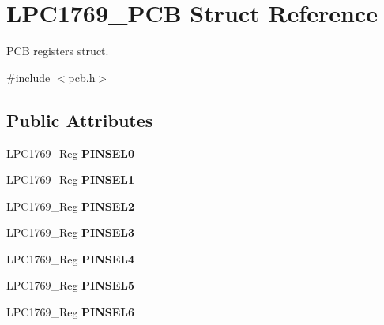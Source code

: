 \hypertarget{struct_l_p_c1769___p_c_b}{\section{L\+P\+C1769\+\_\+\+P\+C\+B Struct Reference}
\label{struct_l_p_c1769___p_c_b}
}


P\+C\+B registers struct.  




{\ttfamily \#include $<$pcb.\+h$>$}

\subsection*{Public Attributes}
\begin{DoxyCompactItemize}
\item 
\hypertarget{struct_l_p_c1769___p_c_b_a68940dff298029649dd0c2db4b47ff5c}{L\+P\+C1769\+\_\+\+Reg {\bfseries P\+I\+N\+S\+E\+L0}}\label{struct_l_p_c1769___p_c_b_a68940dff298029649dd0c2db4b47ff5c}

\item 
\hypertarget{struct_l_p_c1769___p_c_b_a3be3f3c609c301f76817b6e8126e8d7f}{L\+P\+C1769\+\_\+\+Reg {\bfseries P\+I\+N\+S\+E\+L1}}\label{struct_l_p_c1769___p_c_b_a3be3f3c609c301f76817b6e8126e8d7f}

\item 
\hypertarget{struct_l_p_c1769___p_c_b_a367752e90ed07a83ce2577a47e6f7bde}{L\+P\+C1769\+\_\+\+Reg {\bfseries P\+I\+N\+S\+E\+L2}}\label{struct_l_p_c1769___p_c_b_a367752e90ed07a83ce2577a47e6f7bde}

\item 
\hypertarget{struct_l_p_c1769___p_c_b_a7253f85c2644005c53a2909ee230fee0}{L\+P\+C1769\+\_\+\+Reg {\bfseries P\+I\+N\+S\+E\+L3}}\label{struct_l_p_c1769___p_c_b_a7253f85c2644005c53a2909ee230fee0}

\item 
\hypertarget{struct_l_p_c1769___p_c_b_a1dd1e46a7dc604edf4f38486ca9de4f1}{L\+P\+C1769\+\_\+\+Reg {\bfseries P\+I\+N\+S\+E\+L4}}\label{struct_l_p_c1769___p_c_b_a1dd1e46a7dc604edf4f38486ca9de4f1}

\item 
\hypertarget{struct_l_p_c1769___p_c_b_a97e5e86550d635ddc572533d53b3da41}{L\+P\+C1769\+\_\+\+Reg {\bfseries P\+I\+N\+S\+E\+L5}}\label{struct_l_p_c1769___p_c_b_a97e5e86550d635ddc572533d53b3da41}

\item 
\hypertarget{struct_l_p_c1769___p_c_b_af469cad0eae6463ec4bf49f83d794773}{L\+P\+C1769\+\_\+\+Reg {\bfseries P\+I\+N\+S\+E\+L6}}\label{struct_l_p_c1769___p_c_b_af469cad0eae6463ec4bf49f83d794773}


\end{DoxyCompactItemize}
